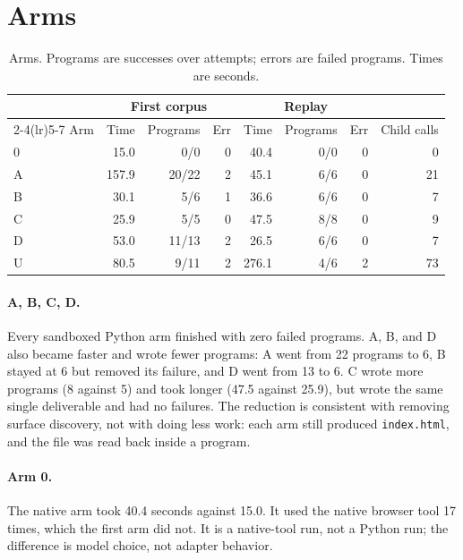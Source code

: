 \documentclass[11pt]{article}
\newcommand{\code}[1]{\texttt{#1}}
\begin{document}
\section{Arms}

\begin{table}[h]
\centering
\footnotesize
\setlength{\tabcolsep}{3.5pt}
\begin{tabular}{@{}lrrrrrrr@{}}
\toprule
& \multicolumn{3}{c}{First corpus} & \multicolumn{3}{c}{Replay} & \\
\cmidrule(lr){2-4}\cmidrule(lr){5-7}
Arm & Time & Programs & Err & Time & Programs & Err & Child calls \\
\midrule
0 & 15.0 & 0/0 & 0 & 40.4 & 0/0 & 0 & 0 \\
A & 157.9 & 20/22 & 2 & 45.1 & 6/6 & 0 & 21 \\
B & 30.1 & 5/6 & 1 & 36.6 & 6/6 & 0 & 7 \\
C & 25.9 & 5/5 & 0 & 47.5 & 8/8 & 0 & 9 \\
D & 53.0 & 11/13 & 2 & 26.5 & 6/6 & 0 & 7 \\
U & 80.5 & 9/11 & 2 & 276.1 & 4/6 & 2 & 73 \\
\bottomrule
\end{tabular}
\caption{Arms. Programs are successes over attempts; errors are failed
programs. Times are seconds.}
\end{table}

\paragraph{A, B, C, D.}
Every sandboxed Python arm finished with zero failed programs. A, B, and D also
became faster and wrote fewer programs: A went from 22 programs to 6, B stayed
at 6 but removed its failure, and D went from 13 to 6. C wrote more programs
(8 against 5) and took longer (47.5 against 25.9), but wrote the same single
deliverable and had no failures.
The reduction is consistent with removing surface discovery, not with doing
less work: each arm still produced \code{index.html}, and the file was read back
inside a program.

\paragraph{Arm 0.}
The native arm took 40.4 seconds against 15.0. It used the native browser tool
17 times, which the first arm did not. It is a native-tool run, not a Python
run; the difference is model choice, not adapter behavior.
\end{document}
